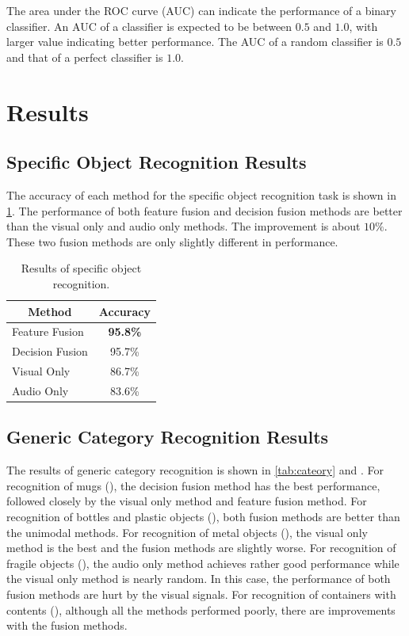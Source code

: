 \documentclass[letterpaper, 10 pt, conference]{ieeeconf}  %
\begin{document}
The area under the ROC curve (AUC) can indicate the performance of a binary classifier. An AUC of a classifier is expected to be between $0.5$ and $1.0$, with larger value indicating better performance. The AUC of a random classifier is $0.5$ and that of a perfect classifier is $1.0$.

\section{Results}
\subsection{Specific Object Recognition Results}
The accuracy of each method for the specific object recognition task is shown in \cref{tab:spec}. The performance of both feature fusion and decision fusion methods are better than the visual only and audio only methods. The improvement is about $10\%$. These two fusion methods are only slightly different in performance.

\begin{table}
  \caption{Results of specific object recognition.}
  \label{tab:spec}
  \centering
  \begin{tabular}[h!]{lc}
    \toprule
    \multicolumn{1}{c}{Method} & Accuracy \\ \midrule
    Feature Fusion & \textbf{95.8\%} \\
    Decision Fusion  & 95.7\% \\
    Visual Only & 86.7\% \\
    Audio Only & 83.6\% \\
    \bottomrule
  \end{tabular}
\end{table}

\subsection{Generic Category Recognition Results}
The results of generic category recognition is shown in \cref{tab:cateory} and . For recognition of mugs (), the decision fusion method has the best performance, followed closely by the visual only method and feature fusion method. For recognition of bottles and plastic objects (), both fusion methods are better than the unimodal methods. For recognition of metal objects (), the visual only method is the best and the fusion methods are slightly worse. For recognition of fragile objects (), the audio only method achieves rather good performance while the visual only method is nearly random. In this case, the performance of both fusion methods are hurt by the visual signals. For recognition of containers with contents (), although all the methods performed poorly, there are improvements with the fusion methods.
\end{document}
